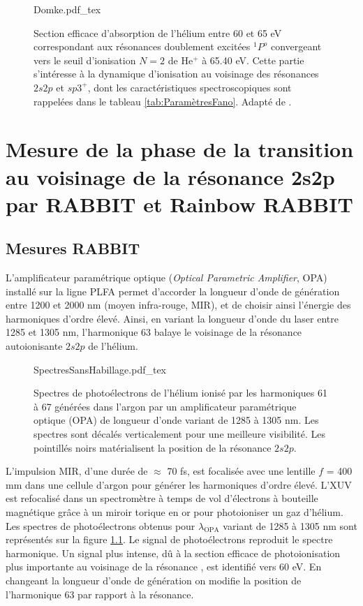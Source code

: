 \begin{figure}[ht]
\centering
\def\svgwidth{0.5\textwidth}
{Domke.pdf_tex}
\caption{Section efficace d'absorption de l'hélium entre 60 et 65 eV correspondant aux résonances doublement excitées $^1P^o$ convergeant vers le seuil d'ionisation $N=2$ de He$^+$ à 65.40 eV. Cette partie s'intéresse à la dynamique d'ionisation au voisinage des résonances $2s2p$ et $sp3^+$, dont les caractéristiques spectroscopiques sont rappelées dans le tableau \ref{tab:ParamètresFano}. Adapté de .}
\label{fig:Domke}
\end{figure}


\chapter[Mesure de la phase de la transition au voisinage de la résonance 2s2p par RABBIT et Rainbow RABBIT]{Mesure de la phase de la transition au voisinage de la résonance \MakeLowercase{2s2p} par RABBIT et Rainbow RABBIT}
\label{chap:HeSaclay_res}
\section{Mesures RABBIT}
L'amplificateur paramétrique optique (\textit{Optical Parametric Amplifier}, OPA) installé sur la ligne PLFA  permet d'accorder la longueur d'onde de génération entre 1200 et 2000 nm (moyen infra-rouge, MIR), et de choisir ainsi l'énergie des harmoniques d'ordre élevé. Ainsi, en variant la longueur d'onde du laser entre 1285 et 1305 nm, l'harmonique 63 balaye le voisinage de la résonance autoionisante $2s2p$ de l'hélium. 

\begin{figure} [ht]
\centering
\def\svgwidth{\textwidth}
{SpectresSansHabillage.pdf_tex}
\caption{Spectres de photoélectrons de l'hélium ionisé par les harmoniques 61 à 67 générées dans l'argon par un amplificateur paramétrique optique (OPA) de longueur d'onde variant de 1285 à 1305 nm. Les spectres sont décalés verticalement pour une meilleure visibilité. Les pointillés noirs matérialisent la position de la résonance $2s2p$.}
\label{fig:SpectresSansHabillageHe}
\end{figure}

L'impulsion MIR, d'une durée de $\approx$ 70 fs, est focalisée avec une lentille $f$ = 400 mm dans une cellule d'argon pour générer les harmoniques d'ordre élevé. L'XUV est refocalisé dans un spectromètre à temps de vol d'électrons à bouteille magnétique grâce à un miroir torique en or pour photoioniser un gaz d'hélium. Les spectres de photoélectrons obtenus pour $\lambda_{\text{OPA}}$ variant de 1285 à 1305 nm sont représentés sur la figure \ref{fig:SpectresSansHabillageHe}. Le signal de photoélectrons reproduit le spectre harmonique. Un signal plus intense, dû à la section efficace de photoionisation plus importante au voisinage de la résonance , est identifié vers 60 eV. En changeant la longueur d'onde de génération on modifie la position de l'harmonique 63 par rapport à la résonance. 

